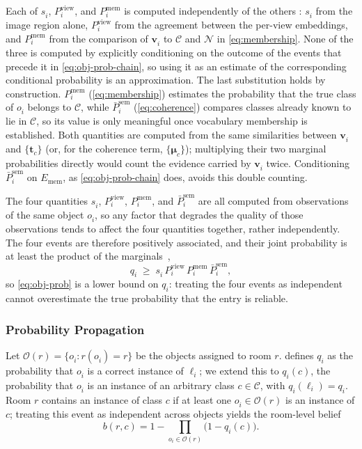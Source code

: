 Each of $s^{}_i$, $P^{\mathrm{view}}_i$, and $P^{\mathrm{mem}}_i$ is computed independently of the others
: $s^{}_i$ from the image region alone, $P^{\mathrm{view}}_i$ from the agreement between the per-view embeddings, and $P^{\mathrm{mem}}_i$ from the comparison of $\mathbf{v}^{}_i$ to $\mathcal{C}$ and $\mathcal{N}$ in \cref{eq:membership}. None of the three is computed by explicitly conditioning on the outcome of the events that precede it in \cref{eq:obj-prob-chain}, so using it as an estimate of the corresponding conditional probability is an approximation.
The last substitution holds by construction. $P^{\mathrm{mem}}_i$ (\cref{eq:membership}) estimates the probability that the true class of $o^{}_i$ belongs to $\mathcal{C}$, while $\bar{P}^{\mathrm{sem}}_i$ (\cref{eq:coherence}) compares classes already known to lie in $\mathcal{C}$, so its value is only meaningful once vocabulary membership is established. Both quantities are computed from the same similarities between $\mathbf{v}^{}_i$ and $\{\mathbf{t}^{}_c\}$ (or, for the coherence term, $\{\boldsymbol{\mu}^{}_c\}$); multiplying their two marginal probabilities directly would count the evidence carried by $\mathbf{v}^{}_i$ twice. Conditioning $\bar{P}^{\mathrm{sem}}_i$ on $E^{}_{\mathrm{mem}}$, as \cref{eq:obj-prob-chain} does, avoids this double counting.

The four quantities $s^{}_i$, $P^{\mathrm{view}}_i$, $P^{\mathrm{mem}}_i$, and $\bar{P}^{\mathrm{sem}}_i$ are all computed from observations of the same object $o^{}_i$, so any factor that degrades the quality of those observations tends to affect the four quantities together, rather independently. The four events are therefore positively associated, and their joint probability is at least the product of the marginals~\cite{esary1967association},
\begin{equation}
    q^{}_i \;\geq\; s^{}_i \, P^{\mathrm{view}}_i \, P^{\mathrm{mem}}_i \, \bar{P}^{\mathrm{sem}}_i ,
    \label{eq:obj-prob-bound}
\end{equation}
so \cref{eq:obj-prob} is a lower bound on $q^{}_i$: treating the four events as independent cannot overestimate the true probability that the entry is reliable.

\subsubsection{Probability Propagation}
\label{sec:probability-propagation}

Let $\mathcal{O}(r) = \{o^{}_i : r(o^{}_i) = r\}$ be the objects assigned to room $r$.  defines $q^{}_i$ as the probability that $o^{}_i$ is a correct instance of $\ell^{}_i$; we extend this to $q^{}_i(c)$, the probability that $o^{}_i$ is an instance of an arbitrary class $c \in \mathcal{C}$, with $q^{}_i(\ell^{}_i) = q^{}_i$. Room $r$ contains an instance of class $c$ if at least one $o^{}_i \in \mathcal{O}(r)$ is an instance of $c$; treating this event as independent across objects yields the room-level belief
\begin{equation}
    b(r, c) = 1 - \prod_{o_i \in \mathcal{O}(r)} \bigl(1 - q^{}_i(c)\bigr).
    \label{eq:noisyor-general}
\end{equation}

